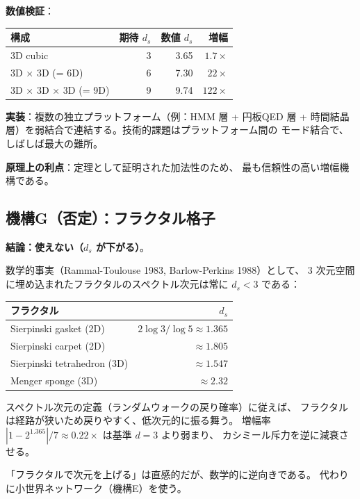 \documentclass[11pt,a4paper]{article}
\begin{document}
\textbf{数値検証}：
\begin{center}
\begin{tabular}{lrrr}
\toprule
構成 & 期待 $d_s$ & 数値 $d_s$ & 増幅 \\
\midrule
3D cubic & 3 & 3.65 & $1.7\times$ \\
3D $\times$ 3D (= 6D) & 6 & 7.30 & $22\times$ \\
3D $\times$ 3D $\times$ 3D (= 9D) & 9 & 9.74 & $122\times$ \\
\bottomrule
\end{tabular}
\end{center}

\textbf{実装}：複数の独立プラットフォーム（例：HMM 層 + 円板QED 層 +
時間結晶層）を弱結合で連結する。技術的課題はプラットフォーム間の
モード結合で、しばしば最大の難所。

\textbf{原理上の利点}：定理として証明された加法性のため、
最も信頼性の高い増幅機構である。

\subsection{機構G（否定）：フラクタル格子}
\label{sec:fractal}

\textbf{結論：使えない（$d_s$ が下がる）}。

数学的事実（Rammal-Toulouse 1983, Barlow-Perkins 1988）として、
3 次元空間に埋め込まれたフラクタルのスペクトル次元は常に $d_s < 3$ である：

\begin{center}
\begin{tabular}{lr}
\toprule
フラクタル & $d_s$ \\
\midrule
Sierpinski gasket (2D) & $2\log 3/\log 5 \approx 1.365$ \\
Sierpinski carpet (2D) & $\approx 1.805$ \\
Sierpinski tetrahedron (3D) & $\approx 1.547$ \\
Menger sponge (3D) & $\approx 2.32$ \\
\bottomrule
\end{tabular}
\end{center}

スペクトル次元の定義（ランダムウォークの戻り確率）に従えば、
フラクタルは経路が狭いため戻りやすく、低次元的に振る舞う。
増幅率 $|1-2^{1.365}|/7 \approx 0.22\times$ は基準 $d=3$ より弱まり、
カシミール斥力を逆に減衰させる。

「フラクタルで次元を上げる」は直感的だが、数学的に逆向きである。
代わりに小世界ネットワーク（機構E）を使う。
\end{document}
